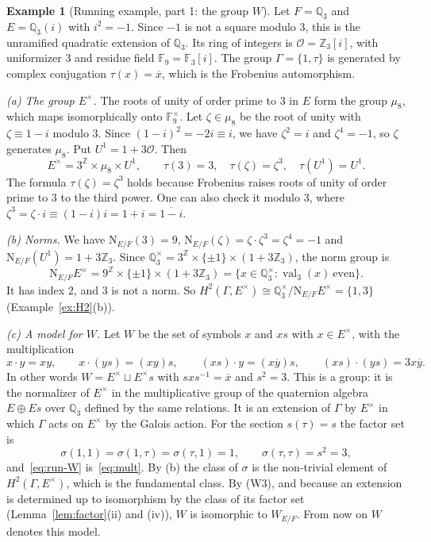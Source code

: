 \documentclass[12pt,letterpaper]{article}
\numberwithin{equation}{section}
\theoremstyle{plain}
\theoremstyle{definition}
\newtheorem{example}[theorem]{Example}
\newcommand{\Z}{\mathbb{Z}}
\newcommand{\Q}{\mathbb{Q}}
\newcommand{\Fq}{\mathbb{F}}
\newcommand{\cO}{\mathcal{O}}
\DeclareMathOperator{\val}{val}
\newcommand{\Nm}{\mathrm{N}_{E/F}}
\begin{document}
\begin{example}[Running example, part 1: the group $W$]\label{ex:run1}
Let $F=\Q_3$ and $E=\Q_3(i)$ with $i^2=-1$. Since $-1$ is not a square
modulo $3$, this is the unramified quadratic extension of $\Q_3$. Its ring
of integers is $\cO=\Z_3[i]$, with uniformizer $3$ and residue field
$\Fq_9=\Fq_3[i]$. The group $\Gamma=\{1,\tau\}$ is generated by complex
conjugation $\tau(x)=\overline{x}$, which is the Frobenius automorphism.

\smallskip\noindent\emph{(a) The group $E^\times$.} The roots of unity of
order prime to $3$ in $E$ form the group $\mu_8$, which maps
isomorphically onto $\Fq_9^\times$. Let $\zeta\in\mu_8$ be the root of
unity with $\zeta\equiv1-i$ modulo $3$. Since
$(1-i)^2=-2i\equiv i$, we have $\zeta^2=i$ and $\zeta^4=-1$, so $\zeta$
generates $\mu_8$. Put $U^1=1+3\cO$. Then
\begin{equation}\label{eq:run-E}
E^\times=3^{\Z}\times\mu_8\times U^1,\qquad
\tau(3)=3,\quad\tau(\zeta)=\zeta^3,\quad\tau(U^1)=U^1 .
\end{equation}
The formula $\tau(\zeta)=\zeta^3$ holds because Frobenius raises roots of
unity of order prime to $3$ to the third power. One can also check it
modulo $3$, where $\zeta^3=\zeta\cdot i\equiv(1-i)i=1+i=\overline{1-i}$.

\smallskip\noindent\emph{(b) Norms.} We have $\Nm(3)=9$,
$\Nm(\zeta)=\zeta\cdot\zeta^3=\zeta^4=-1$ and $\Nm(U^1)=1+3\Z_3$. Since
$\Q_3^\times=3^{\Z}\times\{\pm1\}\times(1+3\Z_3)$, the norm group is
\[
\Nm E^\times=9^{\Z}\times\{\pm1\}\times(1+3\Z_3)
=\{x\in\Q_3^\times:\val_3(x)\ \text{even}\}.
\]
It has index $2$, and $3$ is not a norm. So
$H^2(\Gamma,E^\times)\cong\Q_3^\times/\Nm E^\times=\{1,3\}$
(Example~\ref{ex:H2}(b)).

\smallskip\noindent\emph{(c) A model for $W$.} Let $W$ be the set of
symbols $x$ and $xs$ with $x\in E^\times$, with the multiplication
\begin{equation}\label{eq:run-W}
x\cdot y=xy,\qquad x\cdot(ys)=(xy)s,\qquad
(xs)\cdot y=(x\overline{y})s,\qquad (xs)\cdot(ys)=3x\overline{y}.
\end{equation}
In other words $W=E^\times\sqcup E^\times s$ with $sxs^{-1}=\overline{x}$
and $s^2=3$. This is a group: it is the normalizer of $E^\times$ in the
multiplicative group of the quaternion algebra $E\oplus Es$ over $\Q_3$
defined by the same relations. It is an extension of $\Gamma$ by
$E^\times$ in which $\Gamma$ acts on $E^\times$ by the Galois action. For
the section $s(\tau)=s$ the factor set is
\[
\sigma(1,1)=\sigma(1,\tau)=\sigma(\tau,1)=1,\qquad\sigma(\tau,\tau)=s^2=3,
\]
and~\eqref{eq:run-W} is~\eqref{eq:mult}. By (b) the class of $\sigma$ is
the non-trivial element of $H^2(\Gamma,E^\times)$, which is the
fundamental class. By (W3), and because an extension is determined up to
isomorphism by the class of its factor set (Lemma~\ref{lem:factor}(ii)
and (iv)), $W$ is isomorphic to $W_{E/F}$. From now on $W$ denotes this
model.


\end{example}
\end{document}
